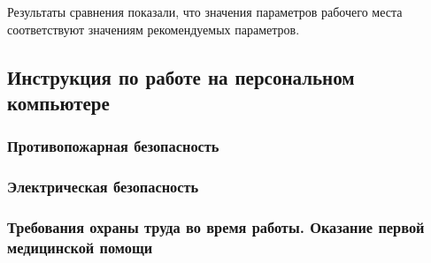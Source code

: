 Результаты сравнения показали, что значения параметров рабочего места 
соответствуют значениям рекомендуемых параметров.

\subsection{Инструкция по работе на персональном компьютере}

\subsubsection{Противопожарная безопасность}

\subsubsection{Электрическая безопасность}

\subsubsection{Требования охраны труда во время работы. Оказание первой медицинской помощи}